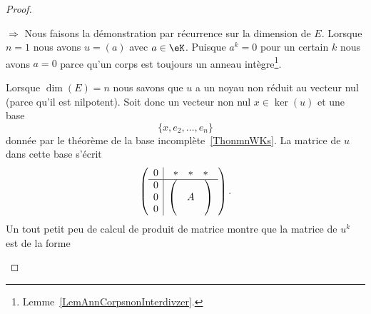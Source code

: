 \begin{proof}
    \begin{subproof}
       \item[\( \Rightarrow\)]
           Nous faisons la démonstration par récurrence sur la dimension de \( E\). Lorsque \( n=1\) nous avons \( u=(a)\) avec \( a\in \eK\). Puisque \( a^k=0\) pour un certain \( k\) nous avons \( a=0\) parce qu'un corps est toujours un anneau intègre\footnote{Lemme~\ref{LemAnnCorpsnonInterdivzer}.}.

           Lorsque \( \dim(E)=n\) nous savons que \( u\) a un noyau non réduit au vecteur nul (parce qu'il est nilpotent). Soit donc un vecteur non nul \( x\in\ker(u)\) et une base
           \begin{equation}
               \{ x,e_2,\ldots, e_n \}
           \end{equation}
           donnée par le théorème de la base incomplète~\ref{ThonmnWKs}. La matrice de \( u\) dans cette base s'écrit
           \begin{equation}
               \begin{pmatrix}
                       \begin{array}[]{c|c}
                           0&\begin{matrix}
                               * &   *    &   *
                           \end{matrix}\\
                           \hline
                           \begin{matrix}
                               0 \\
                               0 \\
                               0
                           \end{matrix}&
                           \begin{pmatrix}
                                &       &       \\
                                &   A   &       \\
                                &       &
                           \end{pmatrix}
                       \end{array}
               \end{pmatrix}.
           \end{equation}
           Un tout petit peu de calcul de produit de matrice montre que la matrice de \( u^k\) est de la forme
           \begin{equation}

\end{equation}
\end{subproof}
\end{proof}
